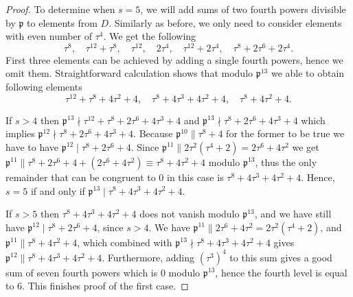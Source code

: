 \documentclass[12pt]{article}
\theoremstyle{remark}
\newcommand{\p}{\mathfrak{p}}
\begin{document}
\begin{proof}
 




To determine when $s=5$, we will add sums of two fourth powers divisible by $\p$ to elements from $D$. Similarly as before, we only need to consider elements with even number of $\tau^4$. We get the following
\[\tau^8,    \quad \tau^{12}+\tau^8, \quad \tau^{12}, \quad 2\tau^4, \quad \tau^{12}+2\tau^4, \quad \tau^8+2\tau^6+2\tau^4.\]
First three elements can be achieved by adding a single fourth powers, hence we omit them. Straightforward calculation shows that modulo $\p^{13}$ we able to obtain following elements
\[ \tau^{12}+\tau^8+4\tau^2+4, \quad \tau^8+4\tau^3+4\tau^2+4, \quad \tau^8+4\tau^2+4.\]


If $s>4$ then $\mathfrak{p}^{13} \nmid \tau^{12}+\tau^8+2\tau^6+4\tau^3+4 $ and $\mathfrak{p}^{13} \nmid \tau^8+2\tau^6+4\tau^3+4$ which implies $\mathfrak{p}^{12} \nmid \tau^8+2\tau^6+4\tau^3+4 $. Because $\mathfrak{p}^{10} \parallel \tau^8+4$ for the former to be true we have to have $\mathfrak{p}^{12} \mid \tau^8+2\tau^6+4$. Since $\mathfrak{p}^{11} \parallel 2\tau^2(\tau^4+2)  = 2\tau^6+4\tau^2$ we get $\mathfrak{p}^{11} \parallel \tau^8+2\tau^6+4  + (2\tau^6+4\tau^2) \equiv  \tau^8+4\tau^2+4  $ modulo $\mathfrak{p}^{13}$, thus the only remainder that can be congruent to 0 in this case is $ \tau^8+4\tau^3+4\tau^2+4$. Hence, $s=5$ if and only if $\mathfrak{p}^{13} \mid  \tau^8+4\tau^3+4\tau^2+4$.










If $s > 5$ then $\tau^8+4\tau^3+4\tau^2+4$ does not vanish modulo $\mathfrak{p}^{13}$, and we have still have $\mathfrak{p}^{12} \mid \tau^8+2\tau^6+4$, since $s>4$. We have $\mathfrak{p}^{11} \parallel 2\tau^6+4\tau^2 = 2\tau^2(\tau^4+2)$, and $\mathfrak{p}^{11} \parallel \tau^8+4\tau^2+4$, which combined with $\mathfrak{p}^{13} \nmid  \tau^8+4\tau^3+4\tau^2+4$ gives $\mathfrak{p}^{12} \parallel \tau^8+4\tau^3+4\tau^2+4 $. Furthermore, adding $(\tau^3)^4$ to this sum gives a good sum of seven fourth powers which is 0 modulo $\mathfrak{p}^{13}$, hence the fourth level is equal to 6. This finishes proof of the first case.



















\end{proof}
\end{document}
